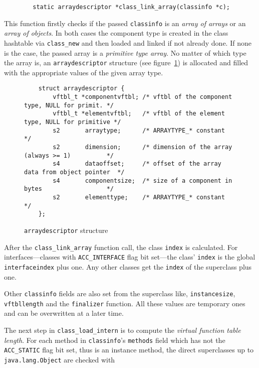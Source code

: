 \begin{verbatim}
        static arraydescriptor *class_link_array(classinfo *c);
\end{verbatim}

This function firstly checks if the passed \texttt{classinfo} is an
\textit{array of arrays} or an \textit{array of objects}. In both
cases the component type is created in the class hashtable via
\texttt{class\_new} and then loaded and linked if not already
done. If none is the case, the passed array is a \textit{primitive
type array}. No matter of which type the array is, an
\texttt{arraydescriptor} structure (see
figure~\ref{arraydescriptorstructure}) is allocated and filled with
the appropriate values of the given array type.

\begin{figure}[h]
\begin{verbatim}
    struct arraydescriptor {
        vftbl_t *componentvftbl; /* vftbl of the component type, NULL for primit. */
        vftbl_t *elementvftbl;   /* vftbl of the element type, NULL for primitive */
        s2       arraytype;      /* ARRAYTYPE_* constant                          */
        s2       dimension;      /* dimension of the array (always >= 1)          */
        s4       dataoffset;     /* offset of the array data from object pointer  */
        s4       componentsize;  /* size of a component in bytes                  */
        s2       elementtype;    /* ARRAYTYPE_* constant                          */
    };
\end{verbatim}
\caption{\texttt{arraydescriptor} structure}
\label{arraydescriptorstructure}
\end{figure}

After the \texttt{class\_link\_array} function call, the class
\texttt{index} is calculated. For interfaces---classes with
\texttt{ACC\_INTERFACE} flag bit set---the class' \texttt{index} is
the global \texttt{interfaceindex} plus one. Any other classes get the
\texttt{index} of the superclass plus one.

Other \texttt{classinfo} fields are also set from the superclass like,
\texttt{instancesize}, \texttt{vftbllength} and the \texttt{finalizer}
function. All these values are temporary ones and can be overwritten
at a later time.

The next step in \texttt{class\_load\_intern} is to compute the
\textit{virtual function table length}. For each method in
\texttt{classinfo}'s \texttt{methods} field which has not the
\texttt{ACC\_STATIC} flag bit set, thus is an instance method, the
direct superclasses up to \texttt{java.lang.Object} are checked with

